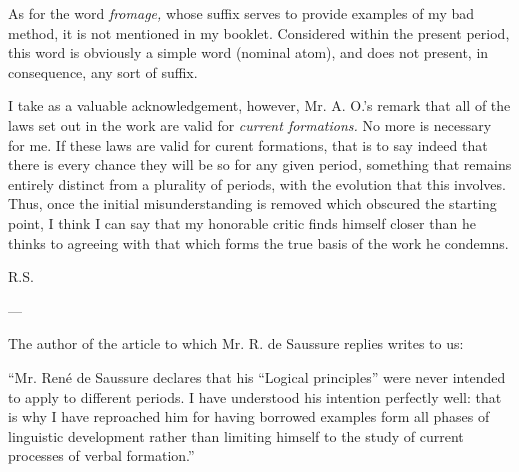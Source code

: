 \begin{appendices}
{    As for the word \emph{fromage,} whose suffix serves to provide
    examples of my bad method, it is not mentioned in my
    booklet. Considered within the present period, this word is
    obviously a simple word (nominal atom), and does not present, in
    consequence, any sort of suffix.

    I take as a valuable acknowledgement, however, Mr. A. O.'s remark
    that all of the laws set out in the work are valid for
    \emph{current formations.} No more is necessary for me. If these
    laws are valid for curent formations, that is to say indeed that
    there is every chance they will be so for any given period,
    something that remains entirely distinct from a plurality of
    periods, with the evolution that this involves. Thus, once the
    initial misunderstanding is removed which obscured the starting
    point, I think I can say that my honorable critic finds himself
    closer than he thinks to agreeing with that which forms the true
    basis of the work he condemns.

    \begin{flushright}
      {R.S.}
    \end{flushright}

    \begin{center}
      ---
    \end{center}

    The author of the article to which Mr. R. de Saussure replies
    writes to us:

    ``Mr. René de Saussure declares that his ``Logical principles''
    were never intended to apply to different periods. I have
    understood his intention perfectly well: that is why I have
    reproached him for having borrowed examples form all phases of
    linguistic development rather than limiting himself to the study
    of current processes of verbal formation.''
    
  }

\end{appendices}

